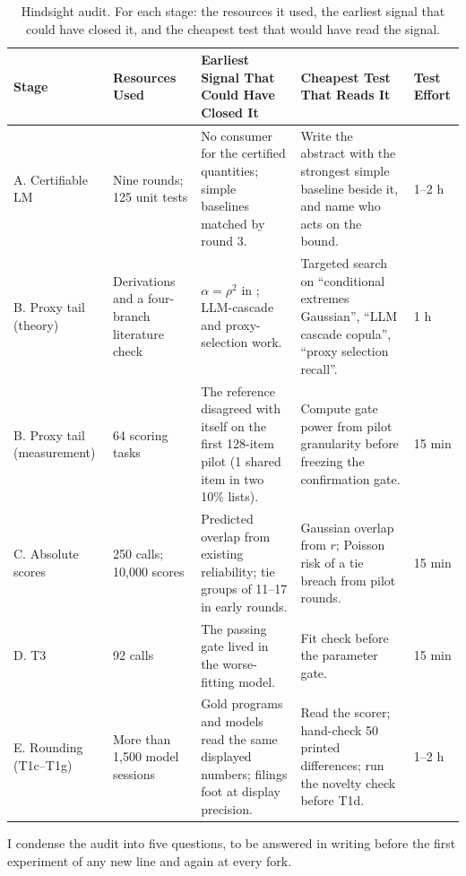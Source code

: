 \documentclass[11pt]{article}
\begin{document}
\begin{table}[!t]
\centering
\scriptsize
\renewcommand{\arraystretch}{1.18}
\begin{tabularx}{\textwidth}{@{}L{1.75cm}L{3.0cm}YYL{1.4cm}@{}}
\toprule
\textbf{Stage} & \textbf{Resources Used} & \textbf{Earliest Signal That Could Have Closed It} & \textbf{Cheapest Test That Reads It} & \textbf{Test Effort} \\
\midrule
A. Certifiable LM & Nine rounds; 125 unit tests & No consumer for the certified quantities; simple baselines matched by round 3. & Write the abstract with the strongest simple baseline beside it, and name who acts on the bound. & 1--2 h \\
B. Proxy tail (theory) & Derivations and a four-branch literature check & $\alpha=\rho^2$ in \citet{heffernan2004conditional}; LLM-cascade and proxy-selection work. & Targeted search on ``conditional extremes Gaussian'', ``LLM cascade copula'', ``proxy selection recall''. & 1 h \\
B. Proxy tail (measurement) & 64 scoring tasks & The reference disagreed with itself on the first 128-item pilot (1 shared item in two 10\% lists). & Compute gate power from pilot granularity before freezing the confirmation gate. & 15 min \\
C. Absolute scores & 250 calls; 10,000 scores & Predicted overlap from existing reliability; tie groups of 11--17 in early rounds. & Gaussian overlap from $r$; Poisson risk of a tie breach from pilot rounds. & 15 min \\
D. T3 & 92 calls & The passing gate lived in the worse-fitting model. & Fit check before the parameter gate. & 15 min \\
E. Rounding (T1c--T1g) & More than 1,500 model sessions & Gold programs and models read the same displayed numbers; filings foot at display precision. & Read the scorer; hand-check 50 printed differences; run the novelty check before T1d. & 1--2 h \\
\bottomrule
\end{tabularx}
\caption{Hindsight audit. For each stage: the resources it used, the earliest signal that could have closed it, and the cheapest test that would have read the signal.}
\label{tab:audit}
\end{table}

I condense the audit into five questions, to be answered in writing before the first experiment of any new line and again at every fork.
\end{document}
